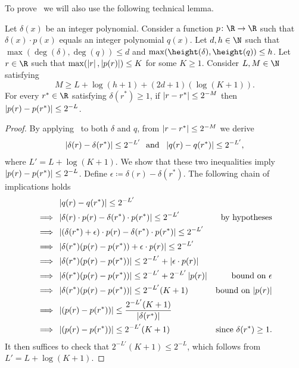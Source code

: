 To prove~ we will also use the following 
technical lemma. 

\begin{lemma}
  \label{lemma:auxiliary-for-approximations}
  Let $\delta(x)$ be an integer polynomial. Consider a function $p \colon \R \to
  \R$ such that $\delta(x) \cdot p(x)$ equals an integer polynomial $q(x)$. Let
  $d,h \in \N$ such that $\max(\deg(\delta),\deg(q)) \leq d$ and
  $\max(\height(\delta),\height(q)) \leq h$. Let $r \in \R$ such that
  $\max(\left|r\right|,\left|p(r)\right|) \leq K$ for some $K \geq 1$. Consider $L,M \in \N$
  satisfying 
  \[
    M \geq L + \log(h+1) + (2 d +1)(\log(K+1)).
  \] 
  For every $r^* \in \R$ satisfying $\delta(r^*) \geq 1$, if $\left|r-r^*\right| \leq
  2^{-M}$ then $\left|p(r)-p(r^*)\right| \leq 2^{-L}$. 
\end{lemma}

\begin{proof}
  By applying~ to both $\delta$ and $q$, 
  from $\left|r-r^*\right| \leq 2^{-M}$ 
  we derive 
  \begin{align*}
    \left|\delta(r)-\delta(r^*)\right| \leq 2^{-L'}
    \text{ \ and \ }
    \left|q(r) - q(r^*)\right| \leq 2^{-L'},
  \end{align*}
  where $L' = L + \log(K+1)$. 
  We show that these two inequalities imply $\left|p(r)-p(r^*)\right| \leq 2^{-L}$.
  Define $\epsilon \coloneqq \delta(r)-\delta(r^*)$. The following chain of implications holds 
  \begin{align*}
    &\left|q(r) - q(r^*)\right| \leq 2^{-L'}\\
    \implies{}&\left|\delta(r) \cdot p(r) - \delta(r^*) \cdot p(r^*)\right| \leq 2^{-L'}
    &\text{by hypotheses}\\
    \implies{}&\left|(\delta(r^*)+\epsilon) \cdot p(r) - \delta(r^*) \cdot p(r^*)\right| \leq 2^{-L'}\\
    \implies{}&\left|\delta(r^*)(p(r)-p(r^*)) + \epsilon \cdot p(r)\right| \leq 2^{-L'}\\
    \implies{}&\left|\delta(r^*)(p(r)-p(r^*))\right| \leq 2^{-L'} + \left|\epsilon \cdot p(r)\right|\\
    \implies{}&\left|\delta(r^*)(p(r)-p(r^*))\right| \leq 2^{-L'} + 2^{-L'}\left|p(r)\right|
    &\text{bound on $\epsilon$}\\
    \implies{}&\left|\delta(r^*)(p(r)-p(r^*))\right| \leq 2^{-L'}(K+1)
    &\text{bound on $\left|p(r)\right|$}\\
    \implies{}&\left|(p(r)-p(r^*))\right| \leq \frac{2^{-L'}(K+1)}{\left|\delta(r^*)\right|}\\
    \implies{}&\left|(p(r)-p(r^*))\right| \leq 2^{-L'}(K+1)
    &\text{since $\delta(r^*) \geq 1$.}
  \end{align*}
  It then suffices to check that $2^{-L'}(K+1) \leq 2^{-L}$, 
  which follows from $L' = L + \log(K+1)$.
\end{proof}

